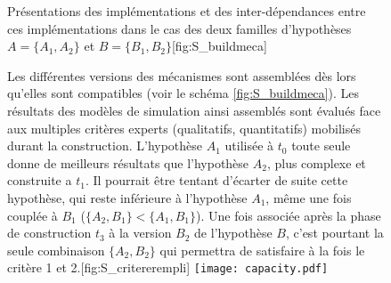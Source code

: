 \begin{figure}[p]
	\begin{sidecaption}{Présentations des implémentations et des inter-dépendances entre ces implémentations dans le cas des deux familles d'hypothèses $A = \{A_1,A_2\}$ et $B = \{B_1, B_2\}$}[fig:S_buildmeca]
	 \centering
	 \qquad
	\end{sidecaption}
\end{figure}


\begin{figure}[htbp]
\begin{sidecaption}{Les différentes versions des mécanismes sont assemblées dès lors qu'elles sont compatibles (voir le schéma \ref{fig:S_buildmeca}). Les résultats des modèles de simulation ainsi assemblés sont évalués face aux multiples critères experts (qualitatifs, quantitatifs) mobilisés durant la construction. L'hypothèse $A_1$ utilisée à $t_0$ toute seule donne de meilleurs résultats que l'hypothèse $A_2$, plus complexe et construite a $t_1$. Il pourrait être tentant d'écarter de suite cette hypothèse, qui reste inférieure à l'hypothèse $A_1$, même une fois couplée à $B_1$ ($\{A_2,B_1\} < \{A_1,B_1\}$). Une fois associée après la phase de construction $t_3$ à la version $B_2$ de l'hypothèse $B$, c'est pourtant la seule combinaison $\{A_2,B_2\}$ qui permettra de satisfaire à la fois le critère 1 et 2.}[fig:S_critererempli]
  \centering
 \texttt{[image: capacity.pdf]}
  \end{sidecaption}
\end{figure}

